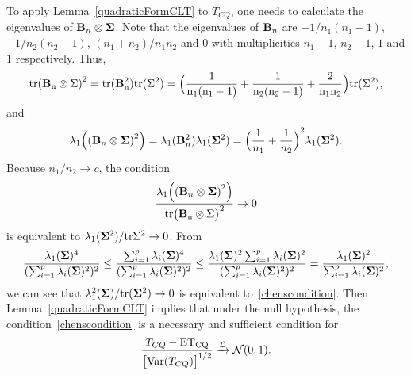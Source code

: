 \documentclass[times,sort&compress,3p]{elsarticle}
\newcommand{\mytr}{\rm tr}
\newcommand{\myE}{\rm E}
\theoremstyle{plain}
\theoremstyle{definition}
\theoremstyle{remark}
\begin{document}
To apply Lemma~\ref{quadraticFormCLT} to $T_{CQ}$, one needs to calculate the eigenvalues of $\mathbf{B}_n\otimes \boldsymbol{\Sigma}$.
    Note that the eigenvalues of $\mathbf{B}_n$ are $-1/n_1(n_1-1)$, $-1/n_2(n_2-1)$, $(n_1+n_2)/n_1 n_2$ and $0$ with multiplicities $n_1-1$, $n_2-1$, $1$ and $1$ respectively.
    Thus,
    \begin{equation*}
        \mytr{(\BB_n\otimes \bSigma)}^2=\mytr(\BB_n^2)\mytr(\bSigma^2)=\Big(\frac{1}{n_1(n_1-1)}+\frac{1}{n_2(n_2-1)}+\frac{2}{n_1 n_2}\Big)\mytr (\bSigma^2),
    \end{equation*}
and
    \begin{equation*}
        \lambda_{1}\Big({(\mathbf{B}_n\otimes \boldsymbol{\Sigma})}^2\Big)=\lambda_{1}(\mathbf{B}_n^2)\lambda_{1}(\boldsymbol{\Sigma}^2)={\Big(\frac{1}{n_1}+\frac{1}{n_2}\Big)}^2\lambda_{1}(\boldsymbol{\Sigma}^2).
    \end{equation*}
    Because $n_1/n_2\to c$, the condition
    $$
         \frac{\lambda_{1}\Big({(\BB_n\otimes \bSigma)}^2\Big)}{
\mytr{\big(\BB_n\otimes \bSigma\big)}^2}
         \to 0
    $$
     is equivalent to $\lambda_{1}(\bSigma^2)/\mytr\bSigma^2\to 0$.
From
$$
\frac{\lambda_1(\boldsymbol{\Sigma})^4}{(\sum_{i=1}^p \lambda_i(\boldsymbol{\Sigma})^2)^2}
\leq
\frac{\sum_{i=1}^p\lambda_i(\boldsymbol{\Sigma})^4}{(\sum_{i=1}^p \lambda_i(\boldsymbol{\Sigma})^2)^2}
\leq
\frac{\lambda_1(\boldsymbol{\Sigma})^2\sum_{i=1}^p\lambda_i(\boldsymbol{\Sigma})^2}{(\sum_{i=1}^p \lambda_i(\boldsymbol{\Sigma})^2)^2}
=
\frac{\lambda_1(\boldsymbol{\Sigma})^2}{\sum_{i=1}^p \lambda_i(\boldsymbol{\Sigma})^2},
$$
    we can see that ${\lambda_{1}^2(\boldsymbol{\Sigma})}/{\mathrm{tr}(\boldsymbol{\Sigma}^2)}\to 0$  is equivalent to~\eqref{chenscondition}.
Then Lemma~\ref{quadraticFormCLT} implies that under the null hypothesis, the condition~\eqref{chenscondition} is a necessary and sufficient condition for 
    \begin{equation*}
        \frac{T_{CQ}-\myE T_{CQ}}{{\big[\mathrm{Var}(T_{CQ})\big]}^{1/2}}\xrightarrow{\mathcal{L}}\mathcal{N}(0,1).
    \end{equation*}
\end{document}
